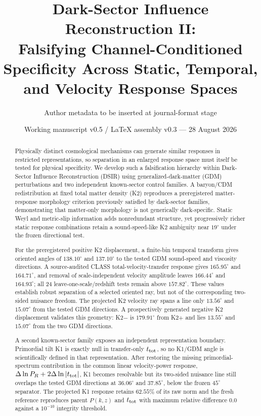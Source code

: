 \documentclass[11pt]{article}
\title{Dark-Sector Influence Reconstruction II:\\Falsifying Channel-Conditioned Specificity Across Static, Temporal, and Velocity Response Spaces}
\author{Author metadata to be inserted at journal-format stage}
\date{Working manuscript v0.5 / LaTeX assembly v0.3 --- 28 August 2026}
\newcommand{\ttot}{t_{\rm tot}}
\newcommand{\dln}{\Delta\ln}
\begin{document}
\maketitle

\begin{abstract}
Physically distinct cosmological mechanisms can generate similar responses in restricted representations, so separation in an enlarged response space must itself be tested for physical specificity. We develop such a falsification hierarchy within Dark-Sector Influence Reconstruction (DSIR) using generalized-dark-matter (GDM) perturbations and two independent known-sector control families. A baryon/CDM redistribution at fixed total matter density (K2) reproduces a preregistered matter-response morphology criterion previously satisfied by dark-sector families, demonstrating that matter-only morphology is not generically dark-specific. Static Weyl and metric-slip information adds nonredundant structure, yet progressively richer static response combinations retain a sound-speed-like K2 ambiguity near $19^\circ$ under the frozen directional test.

For the preregistered positive K2 displacement, a finite-bin temporal transform gives oriented angles of $138.10^\circ$ and $137.10^\circ$ to the tested GDM sound-speed and viscosity directions. A source-audited CLASS total-velocity-transfer response gives $165.95^\circ$ and $164.71^\circ$, and removal of scale-independent velocity amplitude leaves $166.44^\circ$ and $164.93^\circ$; all 24 leave-one-scale/redshift tests remain above $157.82^\circ$. These values establish robust separation of a selected oriented ray, but not of the corresponding two-sided nuisance freedom. The projected K2 velocity ray spans a line only $13.56^\circ$ and $15.07^\circ$ from the tested GDM directions. A prospectively generated negative K2 displacement validates this geometry: K2$-$ is $179.91^\circ$ from K2$+$ and lies $13.55^\circ$ and $15.07^\circ$ from the two GDM directions.

A second known-sector family exposes an independent representation boundary. Primordial tilt K1 is exactly null in transfer-only $\ttot$, so no K1/GDM angle is scientifically defined in that representation. After restoring the missing primordial-spectrum contribution in the common linear velocity-power response, $\dln P_R+2\dln|\ttot|$, K1 becomes resolvable but its two-sided nuisance line still overlaps the tested GDM directions at $36.06^\circ$ and $37.85^\circ$, below the frozen $45^\circ$ separator. The projected K1 response retains $62.55\%$ of its raw norm and the fresh reference reproduces parent $P(k,z)$ and $\ttot$ with maximum relative difference $0.0$ against a $10^{-10}$ integrity threshold.


\end{abstract}
\end{document}

